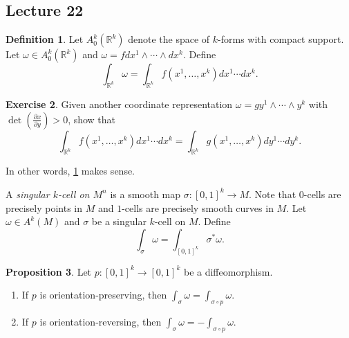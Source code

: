 \documentclass[10pt,letterpaper,cm]{nupset}
\theoremstyle{definition}
\newtheorem{definition}{Definition}[subsection]
\theoremstyle{theorem}
\newtheorem{prop}[definition]{Proposition}
\newtheorem{exercise}[definition]{Exercise}
\theoremstyle{remark}
\newcommand{\R}{\mathbb R}
\newcommand{\1}{\mathbf{1}}
\newcommand{\0}{\vec 0}
\begin{document}
\subsection{Lecture 22}


\begin{definition}\label{forms}
Let $A_0^k\left(\R^k\right)$ denote the space of $k$-forms with compact support. Let $\omega \in A_0^k(\R^k)$ and  $\omega = fdx^1\wedge \cdots \wedge dx^k$. Define $$ \int_{\R^k}\omega = \int_{\R^k} f(x^1, \ldots, x^k)dx^1\cdots dx^k  .$$
\end{definition}

\begin{exercise}
Given another coordinate representation $\omega = gy^1 \wedge \cdots \wedge y^k$ with $\det\left(\frac{\partial{x}}{\partial{y}}\right) >0$, show that $$\int_{\R^k} f(x^1, \ldots, x^k)dx^1\cdots dx^k  = \int_{\R^k} g(x^1, \ldots, x^k)dy^1\cdots dy^k.$$
\end{exercise}

In other words, \cref{forms} makes sense.

\medskip


A \textit{singular $k$-cell on $M^n$} is a smooth map $\sigma : \left[0,1\right]^k \to M$.
Note that $0$-cells are precisely points in $M$ and $1$-cells are precisely smooth curves in $M$.
Let $\omega \in A^k(M)$ and $\sigma$ be a singular $k$-cell on $M$. Define $$ \int_{\sigma} \omega = \int_{\left[0,1\right]^k}\sigma^{\ast}\omega  .$$


\begin{prop}\label{preserve}
Let $p: \left[0,1\right]^k \to \left[0,1\right]^k$ be a diffeomorphism. 
\begin{enumerate}
\item If $p$ is orientation-preserving, then $\int_{\sigma} \omega = \int_{\sigma \circ p} \omega$. 
\item If $p$ is orientation-reversing, then $\int_{\sigma} \omega = {-\int_{\sigma \circ p} \omega}.$
\end{enumerate}
\end{prop}
\end{document}
